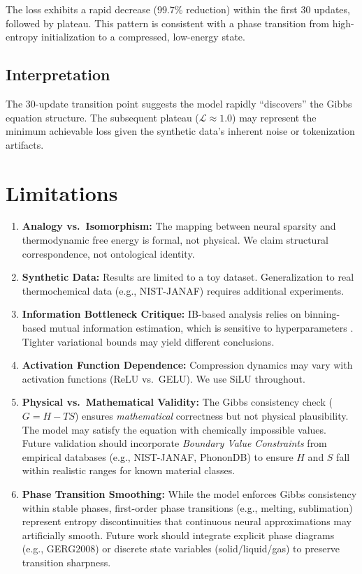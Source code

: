 \documentclass{article}
\begin{document}
The loss exhibits a rapid decrease (99.7\% reduction) within the first 30 updates, followed by plateau. This pattern is consistent with a phase transition from high-entropy initialization to a compressed, low-energy state.

\subsection{Interpretation}
The 30-update transition point suggests the model rapidly ``discovers'' the Gibbs equation structure. The subsequent plateau ($\mathcal{L} \approx 1.0$) may represent the minimum achievable loss given the synthetic data's inherent noise or tokenization artifacts.

\section{Limitations}
\begin{enumerate}
    \item \textbf{Analogy vs.\ Isomorphism:} The mapping between neural sparsity and thermodynamic free energy is formal, not physical. We claim structural correspondence, not ontological identity.
    \item \textbf{Synthetic Data:} Results are limited to a toy dataset. Generalization to real thermochemical data (e.g., NIST-JANAF) requires additional experiments.
    \item \textbf{Information Bottleneck Critique:} IB-based analysis relies on binning-based mutual information estimation, which is sensitive to hyperparameters \cite[Section 4]{ImprovedVIB2024}. Tighter variational bounds may yield different conclusions.
    \item \textbf{Activation Function Dependence:} Compression dynamics may vary with activation functions (ReLU vs.\ GELU). We use SiLU throughout.
    \item \textbf{Physical vs.\ Mathematical Validity:} The Gibbs consistency check ($G=H-TS$) ensures \textit{mathematical} correctness but not physical plausibility. The model may satisfy the equation with chemically impossible values. Future validation should incorporate \textit{Boundary Value Constraints} from empirical databases (e.g., NIST-JANAF, PhononDB) to ensure $H$ and $S$ fall within realistic ranges for known material classes.
    \item \textbf{Phase Transition Smoothing:} While the model enforces Gibbs consistency within stable phases, first-order phase transitions (e.g., melting, sublimation) represent entropy discontinuities that continuous neural approximations may artificially smooth. Future work should integrate explicit phase diagrams (e.g., GERG2008) or discrete state variables (solid/liquid/gas) to preserve transition sharpness.
\end{enumerate}
\end{document}
